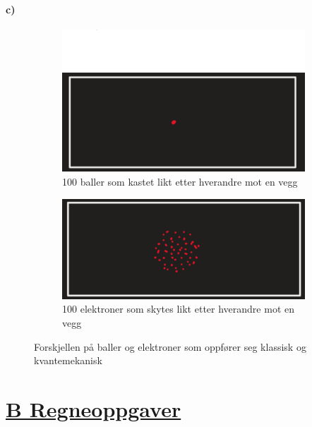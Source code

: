 \documentclass{article}
\begin{document}
\subsection*{c)}
\begin{figure}
    \centering
    \begin{subfigure}{.49\textwidth}
      \centering
      \includegraphics[width = \textwidth]{Figures/A.2.b.1.png}
      \caption{100 baller som kastet likt etter hverandre mot en vegg}
      \label{fig: 100 baller}
    \end{subfigure}
    \hfill
    \begin{subfigure}{.49\textwidth}
      \centering
      \includegraphics[width = \textwidth]{Figures/A.2.b.2.png}
      \caption{100 elektroner som skytes likt etter hverandre mot en vegg}
      \label{fig: 100 elektroner}
    \end{subfigure}
    \hfill
    \caption{Forskjellen på baller og elektroner som oppfører seg klassisk og kvantemekanisk}
    \label{fig: A.2.b}
\end{figure}


\part*{\underline{B Regneoppgaver}}
\end{document}
